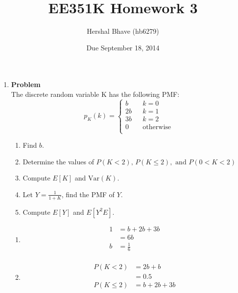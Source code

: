 \documentclass[12pt]{article}
\title{EE351K Homework 3}
\author{Hershal Bhave (hb6279)}
\date{Due September 18, 2014}
\newenvironment{Ex}{\textbf{Problem}\vspace{.75em}\\}{}
\begin{document}
\maketitle
\begin{enumerate}
\item
  \begin{Ex}
    The discrete random variable K has the following PMF:
    \begin{equation*}
      p_K(k) = \left\{
        \begin{aligned}
          b && k=0 \\
          2b && k=1 \\
          3b && k=2 \\
          0 && \text{otherwise} \\
        \end{aligned}
      \end{equation*}
      \begin{enumerate}
      \item Find $b$.
      \item Determine the values of $P(K<2) \text{, } P(K \le 2),
        \text{ and } P(0<K<2)$
      \item Compute $E[K]$ and $\text{Var}(K)$.
      \item Let $Y = \frac{1}{1+K}$, find the PMF of $Y$.
      \item Compute $E[Y]$ and $E[Y^2E]$.
      \end{enumerate}
      \begin{solution} \hfill
        \begin{enumerate}
        \item 
          \begin{equation}
            \label{eq:1a-sol}
            \begin{aligned}
              1 &= b + 2b + 3b \\
              &= 6b \\
              b &= \frac{1}{6} \\
            \end{aligned}
          \end{equation}
        \item
          \begin{equation}
            \label{eq:1b-k-lt-2-sol}
            \begin{aligned}
              P(K<2) &= 2b + b \\
              &= 0.5 \\
              P(K\le2) &= b + 2b + 3b \\

\end{aligned}
\end{equation}
\end{enumerate}
\end{solution}
\end{Ex}
\end{enumerate}
\end{document}
